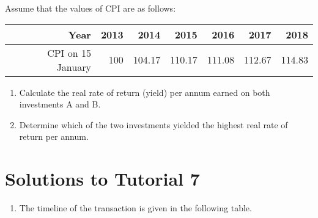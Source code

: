 \documentclass[
]{article}
\providecommand{\tightlist}{%
  \setlength{\itemsep}{0pt}\setlength{\parskip}{0pt}}
\theoremstyle{definition}
\theoremstyle{definition}
\theoremstyle{definition}
\theoremstyle{definition}
\theoremstyle{remark}
\begin{document}
\begin{enumerate}
  Assume that the values of CPI are as follows:

  \begin{longtable}[]{@{}rrrrrrr@{}}
  \toprule
  Year & 2013 & 2014 & 2015 & 2016 & 2017 & 2018 \\
  \midrule
  \endhead
  CPI on 15 January & 100 & 104.17 & 110.17 & 111.08 & 112.67 & 114.83 \\
  \bottomrule
  \end{longtable}

  \begin{enumerate}
  \def\labelenumii{\arabic{enumii}.}
  \item
    Calculate the real rate of return (yield) per annum earned on
    both investments A and B.
  \item
    Determine which of the two investments yielded the highest real
    rate of return per annum.
  \end{enumerate}
\end{enumerate}

\hypertarget{solutions-to-tutorial-7}{%
\section{Solutions to Tutorial 7}\label{solutions-to-tutorial-7}}

\begin{enumerate}
\def\labelenumi{\arabic{enumi}.}
\tightlist
\item
  The timeline of the transaction is given in the following table.
\end{enumerate}
\end{document}
